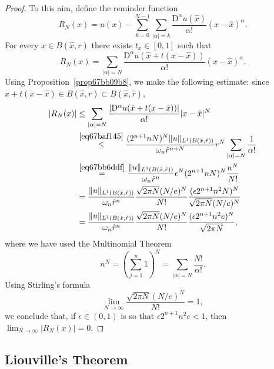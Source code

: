 \documentclass[a4paper,9pt]{amsart}
\newcommand{\Diff}{\mathrm{D}}
\theoremstyle{plain}
\theoremstyle{definition}
\theoremstyle{remark}
\begin{document}
\begin{proof}
	To this aim, define the reminder function
	\[
	R_N(x) = u(x) - \sum_{k=0}^{N-1} \sum_{|\alpha|=k} \frac{\Diff^\alpha u(\hat x)}{\alpha!} (x-\hat x)^\alpha .
	\]
	For every $x\in B(\hat x,r)$ there exists $t_x\in[0,1]$ such that
	\[
	R_N(x) = \sum_{|\alpha|=N} \frac{\Diff^\alpha u(\hat x+t(x-\hat x))}{\alpha!} (x-\hat x)^\alpha .
	\]
	Using Proposition~\ref{prop67bb09b8}, we make the following estimate:
	since $\hat x+t(x-\hat x)\in B(\hat x,r) \subset B(\hat x,\hat r)$,
	\begin{align*}
		|R_N(x)|
		&\le \sum_{|\alpha|=N} \frac{|\Diff^\alpha u(\hat x+t(x-\hat x))|}{\alpha!} |x-\hat x|^N \\
		&\overset{\eqref{eq67baf145}}\le  \frac{(2^{n+1}nN)^N \|u\|_{L^1(B(\hat x,\hat r))}}{\omega_n \hat r^{n+N} }  r^N \sum_{|\alpha|=N}\frac1{\alpha!}\\
		&\overset{\eqref{eq67bb6ddf}}= \frac{\|u\|_{L^1(B(\hat x, \hat r))}}{\omega_n \hat r^n} \epsilon^N (2^{n+1}nN)^N \frac{n^N}{N!} \\
		&= \frac{\|u\|_{L^1(B(\hat x, \hat r))} }{ \omega_n \hat r^n } \frac{\sqrt{2\pi N} (N/e)^N }{N!} 
			\frac{(\epsilon 2^{n+1}n^2N)^{N}}{\sqrt{2\pi N} (N/e)^N } \\
		&= \frac{\|u\|_{L^1(B(\hat x, \hat r))} }{ \omega_n \hat r^n } \frac{\sqrt{2\pi N} (N/e)^N }{N!} 
			\frac{(\epsilon 2^{n+1}n^2e)^{N}}{\sqrt{2\pi N} } ,\\
	\end{align*}
	where we have used the Multinomial Theorem
	\begin{equation}\label{eq67bb6ddf}
		n^N = (\sum_{j=1}^n 1)^N = \sum_{|\alpha|=N} \frac{N!}{\alpha!} .
	\end{equation}
	Using Stirling's formula
	\begin{equation}\label{eq67bb6e37}
		\lim_{N\to\infty} \frac{\sqrt{2\pi N} (N/e)^N }{N!}  = 1 ,
	\end{equation}
	we conclude that, if $\epsilon\in(0,1)$ is so that $\epsilon 2^{n+1}n^2e<1$, then $\lim_{N\to\infty}|R_N(x)|=0$.
\end{proof}




\subsection{Liouville's Theorem}\label{subs67bb6f4c}
\end{document}
